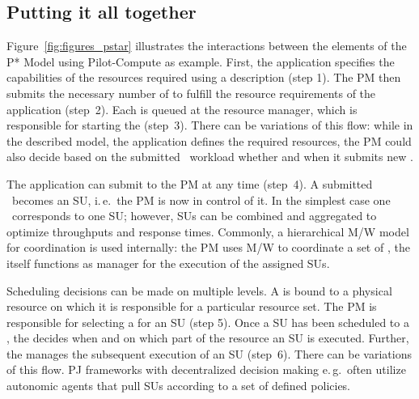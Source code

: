 \documentclass[conference]{IEEEtran}
\begin{document}
\subsection{Putting it all together}   

Figure~\ref{fig:figures_pstar} illustrates the interactions between the
elements of the P* Model using Pilot-Compute as example. First, the
application specifies the capabilities of the resources required using a
\pilotjob description (step 1). The PM then submits the necessary number of
\pilots to fulfill the resource requirements of the application (step~2). Each
\pilot is queued at the resource manager, which is responsible for starting
the \pilot (step~3). There can be variations of this flow: while in the
described model, the application defines the required resources, the PM could
also decide based on the submitted \cu \ workload whether and when it submits
new \pilots.


The application can submit \cus to the PM at any time (step~4). A
submitted \cu \ becomes an SU, i.\,e.\ the PM is now in control of
it. In the simplest case one \cu \ corresponds to one SU; however,
SUs can be combined and aggregated to optimize throughputs and
response times. Commonly, a hierarchical M/W model for coordination
is used internally: the PM uses M/W to coordinate a set of \pilots,
the \pilot itself functions as manager for the execution of the
assigned SUs.

Scheduling decisions can be made on multiple levels. A \pilot is bound
to a physical resource on which it is responsible for a particular
resource set. The PM is responsible for selecting a \pilot for an SU
(step 5). Once a SU has been scheduled to a \pilot, the \pilot decides
when and on which part of the resource an SU is executed.  Further,
the \pilot manages the subsequent execution of an SU (step~6).  There
can be variations of this flow.  PJ frameworks with decentralized
decision making e.\,g.\ often utilize autonomic agents that %
pull SUs according to a set of defined policies.
\end{document}
